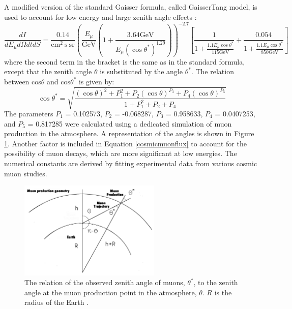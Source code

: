 A modified version of the standard Gaisser formula, called Gaisser\add{-}Tang model, is used to account for low energy and large zenith angle effects \cite{guan2015parametrization}:
\begin{equation}\label{cosmicmuonflux}
    \frac{d I}{d E_\mu d \Omega d t d S}=\frac{0.14}{\mathrm{cm}^2 \mathrm{~s} \ \mathrm{sr} }\left( \frac{E_\mu}{\mathrm{GeV}} \left(1+\frac{3.64 \mathrm{GeV}}{E_\mu\left(\cos \theta^*\right)^{1.29}}\right)\right)^{-2.7}\left[\frac{1}{1+\frac{1.1 E_\mu \cos \theta^*}{115 \mathrm{GeV}}}+\frac{0.054}{1+\frac{1.1 E_\mu \cos \theta^*}{850 \mathrm{GeV}}}\right]
\end{equation}
where the second term in the bracket is the same as in the standard formula, except that the zenith angle 
$\theta$ is substituted by the angle $\theta^*$. The relation between cos$\theta$
and cos$\theta^*$ is given by:
\begin{equation}
    \cos \theta^*=\sqrt{\frac{(\cos \theta)^2+P_1^2+P_2(\cos \theta)^{P_3}+P_4(\cos \theta)^{P_5}}{1+P_1^2+P_2+P_4}}
    \end{equation}
The parameters $P_1$ = 0.102573, $P_2$ = -0.068287, $P_3$ = 0.958633, $P_4$ = 0.0407253, and $P_5$ = 0.817285 were calculated using 
a dedicated simulation of muon production in the atmosphere. A representation of the angles is shown in Figure \ref{fig:anglesinmuon}.
Another factor is included in Equation \ref{cosmicmuonflux} to account for the possibility of muon decays, which are more 
significant at low energies. The numerical constants are derived by fitting experimental data from various cosmic muon studies.
\begin{figure}[!h]
    \centering
    \includegraphics[width =0.6\textwidth]{figures/png/Screenshot_20240526_140716.png}
    \caption[The relation of $\theta^*$ to $\theta$.]{The relation of the observed zenith angle of muons, $\theta^*$, to 
    the zenith angle at the muon production point in the atmosphere, $\theta$. 
    $R$ is the radius of the Earth \cite{guan2015parametrization}.}
    \label{fig:anglesinmuon}
\end{figure}

